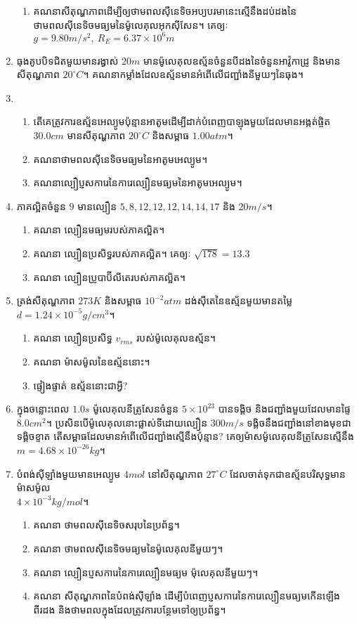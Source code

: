 \begin{enumerate}[m]
\begin{enumerate}
		\item គណនាសីតុណ្ហភាពដើម្បីឲ្យថាមពលសុីនេទិចអប្យបរមានេះស្មើនឹងដប់ដងនៃថាមពលសុីនេទិចមធ្យមនៃម៉ូលេគុលអុកសុីសែន។ គេឲ្យៈ $g=9.80m/s^{2},~R_{E}=6.37\times10^{6}m$
	\end{enumerate}
	\item ធុងគូបបិទជិតមួយមានរង្វាស់ $20m$ មានម៉ូលេគុលឧស្ម័នចំនួនបីដងនៃចំនួនអាវ៉ូកាដ្រូ និងមានសីតុណ្ហភាព $20^\circ C$។ គណនាកម្លាំងដែលឧស្ម័នមានអំពើលើជញ្ជាំងនីមួយៗនៃធុង។
	\item \begin{enumerate}
		\item តើគេត្រូវការឧស្ម័នអេល្យូមប៉ុន្មានអាតូមដើម្បីដាក់បំពេញបាឡុងមួយដែលមានអង្កត់ផ្ចិត $30.0cm$ មានសីតុណ្ហភាព $20^\circ C$ និងសម្ពាធ $1.00atm$។
		\item គណនាថាមពលសុីនេទិចមធ្យមនៃអាតូមអេល្យូម។
		\item គណនាល្បឿប្ញសការេនៃការេល្បឿនមធ្យមនៃអាតូមអេល្យូម។
	\end{enumerate} 
	\item ភាគល្អិតចំនួន $9$ មានល្បឿន $5,8,12,12,12,14,14,17$ និង $20m/s$។
		\begin{enumerate}
			\item គណនា ល្បឿនមធ្យមរបស់ភាគល្អិត។
			\item គណនា ល្បឿនប្រសិទ្ធរបស់ភាគល្អិត។ គេឲ្យៈ $\sqrt{178}=13.3$
			\item គណនា ល្បឿនប្រូបាប៊ីលីតេរបស់ភាគល្អិត។
		\end{enumerate}
	\item ត្រង់សីតុណ្ហភាព $273K$ និងសម្ពាធ $10^{-2}atm$ ដង់សុីតេនៃឧស្ម័នមួយមានតម្លៃ $d=1.24\times10^{-5}g/cm^{3}$។
	\begin{enumerate}
		\item គណនា ល្បឿនប្រសិទ្ធ $v_{rms}$ របស់ម៉ូលេគុលឧស្ម័ន។
		\item គណនា ម៉ាសម៉ូលនៃឧស្ម័ននោះ។
		\item ផ្ទៀងផ្ទាត់ ឧស្ម័ននោះជាអ្វី?
	\end{enumerate}
	\item ក្នុងចន្លោះពេល $1.0s$ ម៉ូលេគុលនីត្រូសែនចំនួន $5\times10^{23}$ បានទង្គិច និងជញ្ជាំងមួយដែលមានផ្ទៃ $8.0cm^{2}$។ ប្រសិនបើម៉ូលេគុលនោះផ្លាស់ទីដោយល្បឿន $300m/s$ ទង្គិចនឹងជញ្ជាំងនៅខាងមុខជាទង្គិចខ្ទាត តើសម្ពាធដែលមានអំពើលើជញ្ជាំងស្មើនឹងប៉ុន្មាន? គេឲ្យម៉ាសម៉ូលេគុលនីត្រូសែនស្មើនឹង $m=4.68\times10^{-26}kg$។
	\item បំពង់សុីឡាំងមួយមានអេល្យូម $4mol$ នៅសីតុណ្ហភាព $27^\circ C$ ដែលចាត់ទុកជាឧស្ម័នបរិសុទ្ធមានម៉ាសម៉ូល\\ $4\times 10^{-3}kg/mol$។
	\begin{enumerate}
		\item គណនា ថាមពលសុីនេទិចសរុបនៃប្រព័ន្ធ។
		\item គណនា ថាមពលសុីនេទិចមធ្យមនៃម៉ូលេគុលនីមួយៗ។
		\item គណនា ល្បឿនប្ញសការេនៃការេល្បឿនមធ្យម ម៉ុលេគុលនីមួយៗ។
		\item គណនា សីតុណ្ហភាពនៃបំពង់សុីឡាំង ដើម្បីបំពេញប្ញសការេនៃការេល្បឿនមធ្យមកើនឡើងពីរដង និងថាមពលក្នុងដែលត្រូវការបន្ថែមទៅឲ្យប្រព័ន្ធ។
	\end{enumerate}
\end{enumerate}